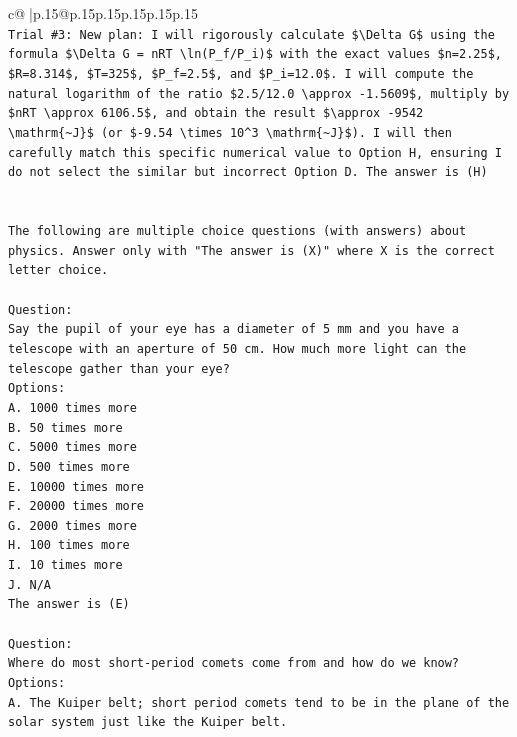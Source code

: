 \documentclass{article}
\begin{document}
{\begin{supertabular}{c@{$\;$}|p{.15\linewidth}@{}p{.15\linewidth}p{.15\linewidth}p{.15\linewidth}p{.15\linewidth}p{.15\linewidth}}
{{{\\ 
\texttt{Trial \#3: New plan: I will rigorously calculate \$\textbackslash{}Delta G\$ using the formula \$\textbackslash{}Delta G = nRT \textbackslash{}ln(P\_f/P\_i)\$ with the exact values \$n=2.25\$, \$R=8.314\$, \$T=325\$, \$P\_f=2.5\$, and \$P\_i=12.0\$. I will compute the natural logarithm of the ratio \$2.5/12.0 \textbackslash{}approx {-}1.5609\$, multiply by \$nRT \textbackslash{}approx 6106.5\$, and obtain the result \$\textbackslash{}approx {-}9542 \textbackslash{}mathrm\{\textasciitilde{}J\}\$ (or \${-}9.54 \textbackslash{}times 10\^{}3 \textbackslash{}mathrm\{\textasciitilde{}J\}\$). I will then carefully match this specific numerical value to Option H, ensuring I do not select the similar but incorrect Option D. The answer is (H)} \\
\\ 
\\ 
\texttt{The following are multiple choice questions (with answers) about physics. Answer only with "The answer is (X)" where X is the correct letter choice.} \\
\\ 
\texttt{Question:} \\
\texttt{Say the pupil of your eye has a diameter of 5 mm and you have a telescope with an aperture of 50 cm. How much more light can the telescope gather than your eye?} \\
\texttt{Options:} \\
\texttt{A. 1000 times more} \\
\texttt{B. 50 times more} \\
\texttt{C. 5000 times more} \\
\texttt{D. 500 times more} \\
\texttt{E. 10000 times more} \\
\texttt{F. 20000 times more} \\
\texttt{G. 2000 times more} \\
\texttt{H. 100 times more} \\
\texttt{I. 10 times more} \\
\texttt{J. N/A} \\
\texttt{The answer is (E)} \\
\\ 
\texttt{Question:} \\
\texttt{Where do most short{-}period comets come from and how do we know?} \\
\texttt{Options:} \\
\texttt{A. The Kuiper belt; short period comets tend to be in the plane of the solar system just like the Kuiper belt.} \\
}}}
\end{supertabular}}
\end{document}
